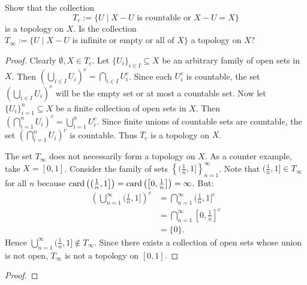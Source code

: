 \documentclass[12pt,twoside,openany]{memoir}
\begin{document}
\begin{exercise}
    Show that the collection $$T_c := \{U  \mid X - U \text{ is countable or }X - U = X\}$$ is a topology on $X$. Is the collection $T_\infty := \{U \mid X-U \text{ is infinite or empty or all of }X\}$ a topology on $X$?
\end{exercise}
    \begin{proof}
        Clearly $\emptyset,X \in T_c$. Let $\{U_i\}_{i \in I} \subseteq X$ be an arbitrary family of open sets in $X$. Then $\left( \bigcup_{i \in I}U_i \right)^c = \bigcap_{i \in I}U_i^c$. Since each $U_i^c$ is countable, the set $\left( \bigcup_{i \in I}U_i \right)^c$ will be the empty set or at most a countable set. Now let $\{U_i\}_{i = 1}^n \subseteq X$ be a finite collection of open sets in $X$. Then $\left( \bigcap_{i = 1}^n U_i \right)^c = \bigcup_{i = 1}^n U_i^c$. Since finite unions of countable sets are countable, the set $\left( \bigcap_{i = 1}^n U_i \right)^c$ is countable. Thus $T_c$ is a topology on $X$.

        The set $T_\infty$ does not necessarily form a topology on $X$. As a counter example, take $X = [0,1]$. Consider the family of sets $\left\{ \bigl( \frac{1}{n},1\bigr] \right\}_{n = 1}^\infty$. Note that $\bigl( \frac{1}{n},1\bigr] \in T_\infty$ for all $n$ because $\operatorname{card} \left( \bigl( \frac{1}{n},1\bigr] \right) = \operatorname{card} \left( \left[ 0,\frac{1}{n} \right] \right) = \infty$. But:
            \begin{equation*}
            \begin{split}
                \left( \bigcup_{n = 1}^\infty \bigl( \frac{1}{n},1\bigr] \right)^c 
                & = \bigcap_{n = 1}^\infty \bigl( \frac{1}{n},1\bigr]^c \\
                & = \bigcap_{n = 1}^\infty \left[ 0,\frac{1}{n} \right]^c \\
                & = \{0\}.
            \end{split}
            \end{equation*}
        Hence $\bigcup_{n = 1}^\infty \bigl( \frac{1}{n},1\bigr] \not\in T_\infty$. Since there exists a collection of open sets whose union is not open, $T_\infty$ is not a topology on $[0,1]$.
    \end{proof}

\begin{exercise}
    
\end{exercise}
\begin{proof}
    
\end{proof}
\end{document}
